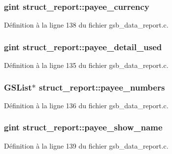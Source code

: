 \subsubsection[{payee\_\-currency}]{\setlength{\rightskip}{0pt plus 5cm}gint {\bf struct\_\-report::payee\_\-currency}}\label{structstruct__report_afb0eb8d31a0add17580c918002236316}


Définition à la ligne 138 du fichier gsb\_\-data\_\-report.c.

\subsubsection[{payee\_\-detail\_\-used}]{\setlength{\rightskip}{0pt plus 5cm}gint {\bf struct\_\-report::payee\_\-detail\_\-used}}\label{structstruct__report_af294133d207954abf2965274d9708864}


Définition à la ligne 135 du fichier gsb\_\-data\_\-report.c.

\subsubsection[{payee\_\-numbers}]{\setlength{\rightskip}{0pt plus 5cm}GSList$\ast$ {\bf struct\_\-report::payee\_\-numbers}}\label{structstruct__report_a0b011406e867357d59d22fd1264c14df}


Définition à la ligne 136 du fichier gsb\_\-data\_\-report.c.

\subsubsection[{payee\_\-show\_\-name}]{\setlength{\rightskip}{0pt plus 5cm}gint {\bf struct\_\-report::payee\_\-show\_\-name}}\label{structstruct__report_a0aaeb9da612069a714bc8c455d3ca438}


Définition à la ligne 139 du fichier gsb\_\-data\_\-report.c.

